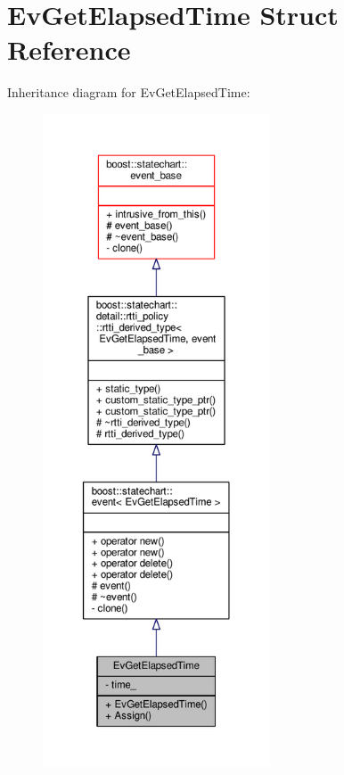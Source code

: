 \hypertarget{struct_ev_get_elapsed_time}{}\section{Ev\+Get\+Elapsed\+Time Struct Reference}
\label{struct_ev_get_elapsed_time}


Inheritance diagram for Ev\+Get\+Elapsed\+Time\+:
\nopagebreak
\begin{figure}[H]
\begin{center}
\leavevmode
\includegraphics[height=550pt]{struct_ev_get_elapsed_time__inherit__graph}
\end{center}
\end{figure}


